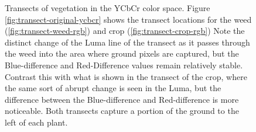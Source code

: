 \documentclass[letterpaper, notitlepage]{report}
\begin{document}
\begin{figure}[h]
	\centering
	\hfill
	\hfill
	\caption[YCbCr Transects]{Transects of vegetation in the YCbCr color space. Figure \ref{fig:transect-original-ycbcr} shows the transect locations for the weed (\ref{fig:transect-weed-rgb}) and crop (\ref{fig:transect-crop-rgb}) Note the distinct change of the Luma line of the transect as it passes through the weed into the area where ground pixels are captured, but the Blue-difference and Red-Difference values remain relatively stable. Contrast this with what is shown in the transect of the crop, where the same sort of abrupt change is seen in the Luma, but the difference between the Blue-difference and Red-difference is more noticeable. Both transects capture a portion of the ground to the left of each plant.}
	\label{fig:transects-ycbcr}
\end{figure}
\end{document}
